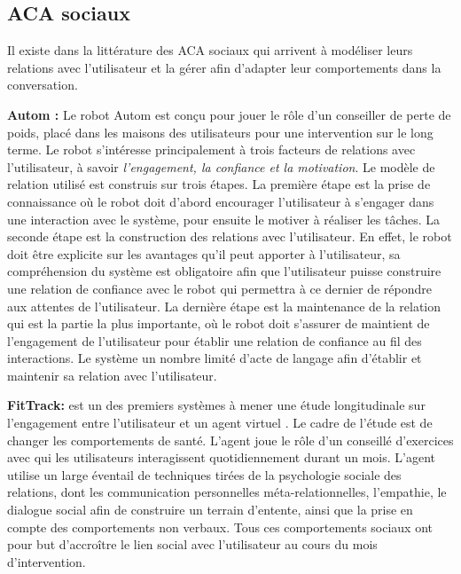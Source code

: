\documentclass[a4paper,french]{article}
\begin{document}

\subsection{ACA sociaux}

\par Il existe dans la littérature des  ACA sociaux  qui arrivent à modéliser leurs relations avec l'utilisateur et la gérer afin d'adapter leur comportements dans la conversation.

\par \textbf{Autom :} Le robot Autom \cite{kidd2005sociable} est conçu pour jouer le rôle d'un conseiller de perte de poids, placé dans les maisons des utilisateurs pour une intervention sur le long terme. Le robot s'intéresse principalement à trois facteurs de relations avec l'utilisateur, à savoir \textit{l'engagement, la confiance et la motivation}.  Le modèle de relation utilisé est construis sur trois étapes. La première étape est la prise de connaissance où le robot doit  d'abord encourager l'utilisateur à s'engager dans une interaction avec le système, pour ensuite le motiver à réaliser les tâches.
La seconde étape est la construction des relations avec l'utilisateur. En effet, le robot doit être explicite sur les avantages qu'il peut apporter à l'utilisateur, sa compréhension du système est obligatoire afin que l'utilisateur puisse construire une relation de confiance avec le robot qui permettra à ce dernier de répondre aux attentes de l'utilisateur.  La dernière étape est la maintenance de la relation qui est la partie la plus importante, où le robot doit s'assurer de maintient de l'engagement de l'utilisateur pour établir une relation de confiance au fil des interactions. Le système un nombre limité d'acte de langage afin d'établir et maintenir sa relation avec l'utilisateur.


\par \textbf{FitTrack: } est un des premiers systèmes à mener une étude longitudinale sur l'engagement entre l'utilisateur et un agent virtuel \cite{bickmore2005s}. Le cadre de l'étude est de changer les comportements de santé. L'agent joue le rôle d'un conseillé d'exercices avec qui les utilisateurs interagissent quotidiennement durant un mois. L'agent utilise un large éventail de techniques tirées de la psychologie sociale des relations, dont les communication personnelles méta-relationnelles, l'empathie, le dialogue social afin de construire un terrain d'entente, ainsi que la prise en compte des comportements non verbaux. Tous ces comportements sociaux ont pour but d’accroître le lien social avec l'utilisateur au cours du mois d'intervention.
\end{document}
